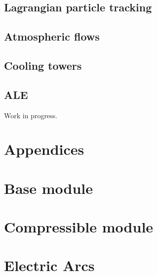 \documentclass[a4paper,10pt,twoside]{csdoc}
\newcounter{prog}[part]
\begin{document}
\chapter{Lagrangian particle tracking}

\chapter{Atmospheric flows}

\chapter{Cooling towers}

\chapter{ALE}
Work in progress.


%
\appendix

\part{Appendices}
\setcounter{chapter}{0}
\setcounter{section}{0}
\setcounter{equation}{0}
\setcounter{figure}{0}


\part{Base module}























\part{Compressible module}
\setcounter{chapter}{0}
\setcounter{section}{0}
\setcounter{equation}{0}
\setcounter{figure}{0}







\part{Electric Arcs}
\setcounter{chapter}{0}
\setcounter{section}{0}
\setcounter{equation}{0}
\setcounter{figure}{0}
\end{document}
